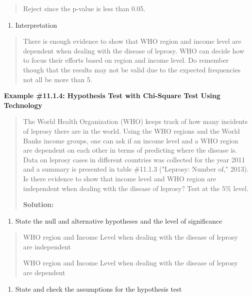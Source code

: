 \documentclass[]{book}
\providecommand{\tightlist}{%
  \setlength{\itemsep}{0pt}\setlength{\parskip}{0pt}}
\begin{document}
\begin{quote}
Reject since the p-value is less than 0.05.
\end{quote}

\begin{enumerate}
\def\labelenumi{\arabic{enumi}.}
\setcounter{enumi}{4}
\tightlist
\item
  Interpretation
\end{enumerate}

\begin{quote}
There is enough evidence to show that WHO region and income level are dependent when dealing with the disease of leprosy. WHO can decide how to focus their efforts based on region and income level. Do remember though that the results may not be valid due to the expected frequencies not all be more than 5.
\end{quote}

\textbf{Example \#11.1.4: Hypothesis Test with Chi-Square Test Using Technology}

\begin{quote}
The World Health Organization (WHO) keeps track of how many incidents of leprosy there are in the world. Using the WHO regions and the World Banks income groups, one can ask if an income level and a WHO region are dependent on each other in terms of predicting where the disease is. Data on leprosy cases in different countries was collected for the year 2011 and a summary is presented in table \#11.1.3 ("Leprosy: Number of," 2013). Is there evidence to show that income level and WHO region are independent when dealing with the disease of leprosy? Test at the 5\% level.

\textbf{Solution:}
\end{quote}

\begin{enumerate}
\def\labelenumi{\arabic{enumi}.}
\tightlist
\item
  State the null and alternative hypotheses and the level of
  significance
\end{enumerate}

\begin{quote}
WHO region and Income Level when dealing with the disease of leprosy are independent

WHO region and Income Level when dealing with the disease of leprosy are dependent
\end{quote}

\begin{enumerate}
\def\labelenumi{\arabic{enumi}.}
\setcounter{enumi}{1}
\tightlist
\item
  State and check the assumptions for the hypothesis test
\end{enumerate}
\end{document}
